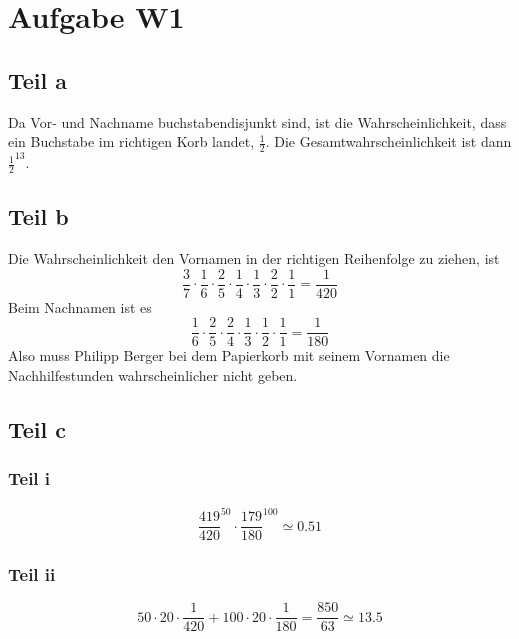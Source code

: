 \documentclass[10pt,a4paper]{article}
\begin{document}
\section{Aufgabe W1}

\subsection{Teil a}
Da Vor- und Nachname buchstabendisjunkt sind, ist die Wahrscheinlichkeit, dass ein Buchstabe im richtigen Korb landet, $\frac{1}{2}$.
Die Gesamtwahrscheinlichkeit ist dann $\frac{1}{2}^{13}$.

\subsection{Teil b}
Die Wahrscheinlichkeit den Vornamen in der richtigen Reihenfolge zu ziehen, ist
\begin{equation}
  \frac{3}{7} \cdot \frac{1}{6} \cdot \frac{2}{5} \cdot \frac{1}{4} \cdot \frac{1}{3} \cdot \frac{2}{2} \cdot \frac{1}{1} = \frac{1}{420}
\end{equation}
Beim Nachnamen ist es
\begin{equation}
  \frac{1}{6} \cdot \frac{2}{5} \cdot \frac{2}{4} \cdot \frac{1}{3} \cdot \frac{1}{2} \cdot \frac{1}{1} = \frac{1}{180}
\end{equation}
Also muss Philipp Berger bei dem Papierkorb mit seinem Vornamen die Nachhilfestunden wahrscheinlicher nicht geben.

\subsection{Teil c}

\subsubsection{Teil i}

\begin{equation}
  \frac{419}{420}^{50} \cdot \frac{179}{180}^{100} \simeq 0.51
\end{equation}

\subsubsection{Teil ii}

\begin{equation}
  50 \cdot 20 \cdot \frac{1}{420} + 100 \cdot 20 \cdot \frac{1}{180} = \frac{850}{63} \simeq 13.5
\end{equation}
\end{document}
